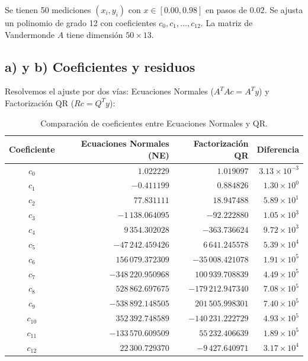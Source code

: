\documentclass[11pt,a4paper]{article}
\begin{document}
Se tienen 50 mediciones $(x_i, y_i)$ con $x \in [0.00, 0.98]$ en pasos de $0.02$. Se ajusta un polinomio de grado 12 con coeficientes $c_0, c_1, \dots, c_{12}$. La matriz de Vandermonde $A$ tiene dimensión $50 \times 13$.

\subsection{a) y b) Coeficientes y residuos}
Resolvemos el ajuste por dos vías: Ecuaciones Normales ($A^T A c = A^T y$) y Factorización QR ($R c = Q^T y$):

\begin{table}[h!]
    \centering
    \caption{Comparación de coeficientes entre Ecuaciones Normales y QR.}
    \begin{tabular}{crrr}
        \toprule
        Coeficiente & Ecuaciones Normales (NE) & Factorización QR & Diferencia \\
        \midrule
        $c_0$   & $1.022229$        & $1.019097$        & $3.13 \times 10^{-3}$ \\
        $c_1$   & $-0.411199$       & $0.884826$        & $1.30 \times 10^{0}$ \\
        $c_2$   & $77.831111$       & $18.947488$       & $5.89 \times 10^{1}$ \\
        $c_3$   & $-1\,138.064095$  & $-92.222880$      & $1.05 \times 10^{3}$ \\
        $c_4$   & $9\,354.302028$   & $-363.736624$     & $9.72 \times 10^{3}$ \\
        $c_5$   & $-47\,242.459426$ & $6\,641.245578$   & $5.39 \times 10^{4}$ \\
        $c_6$   & $156\,079.372309$ & $-35\,008.421078$ & $1.91 \times 10^{5}$ \\
        $c_7$   & $-348\,220.950968$& $100\,939.708839$ & $4.49 \times 10^{5}$ \\
        $c_8$   & $528\,862.697675$ & $-179\,212.947340$& $7.08 \times 10^{5}$ \\
        $c_9$   & $-538\,892.148505$& $201\,505.998301$ & $7.40 \times 10^{5}$ \\
        $c_{10}$& $352\,392.748589$& $-140\,231.222729$& $4.93 \times 10^{5}$ \\
        $c_{11}$& $-133\,570.609509$& $55\,232.406639$ & $1.89 \times 10^{5}$ \\
        $c_{12}$& $22\,300.729370$ & $-9\,427.640971$  & $3.17 \times 10^{4}$ \\
        \bottomrule
    \end{tabular}
\end{table}
\end{document}
